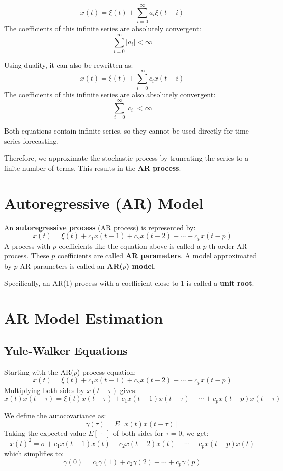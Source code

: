 \documentclass[uplatex,a4j,12pt,dvipdfmx]{jsarticle}
\begin{document}
\[
	x(t) = \xi(t) + \sum^{\infty}_{i=0} a_{i} \xi(t-i)
\]
The coefficients of this infinite series are absolutely convergent:
\[
	\sum^{\infty}_{i=0} |a_{i}| < \infty
\]

Using duality, it can also be rewritten as:
\[
	x(t) = \xi(t) + \sum^{\infty}_{i=0} c_{i} x(t-i)
\]
The coefficients of this infinite series are also absolutely convergent:
\[
	\sum^{\infty}_{i=0} |c_{i}| < \infty
\]

Both equations contain infinite series, so they cannot be used directly for time series forecasting.

Therefore, we approximate the stochastic process by truncating the series to a finite number of terms. This results in the \textbf{AR process}.

\section{Autoregressive (AR) Model}

An \textbf{autoregressive process} (AR process) is represented by:
\[
	x(t) = \xi(t) + c_{1} x(t-1) + c_{2} x(t-2) + \cdots + c_{p} x(t-p)
\]
A process with $p$ coefficients like the equation above is called a $p$-th order AR process. These $p$ coefficients are called \textbf{AR parameters}. A model approximated by $p$ AR parameters is called an \textbf{AR($p$) model}.

Specifically, an AR(1) process with a coefficient close to 1 is called a \textbf{unit root}.


\section{AR Model Estimation}

\subsection{Yule-Walker Equations}

Starting with the AR($p$) process equation:
\[
	x(t) = \xi(t) + c_{1} x(t-1) + c_{2} x(t-2) + \cdots + c_{p} x(t-p)
\]
Multiplying both sides by $x(t- \tau )$ gives:
\[
	x(t)x(t- \tau ) = \xi(t)x(t- \tau ) + c_{1} x(t-1) x(t- \tau ) + \cdots + c_{p} x(t-p) x(t- \tau )
\]

We define the autocovariance as:
\[
	\gamma(\tau) = E[ x(t) x(t-\tau) ]
\]
Taking the expected value $E[ \ \cdot \ ]$ of both sides for $\tau=0$, we get:
\[
	x(t)^{2} = \sigma + c_{1} x(t-1) x(t) + c_{2} x(t-2) x(t) + \cdots + c_{p} x(t-p) x(t)
\]
which simplifies to:
\[
	\gamma(0) = c_{1} \gamma(1) + c_{2} \gamma(2) + \cdots + c_{p} \gamma(p)
\]
\end{document}
